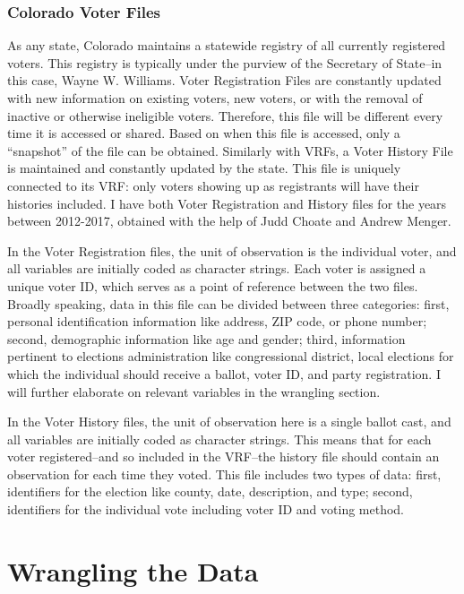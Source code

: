 \documentclass[12pt,twoside]{reedthesis}
\begin{document}
  \subsubsection{Colorado Voter Files}\label{colorado-voter-files}
  
  As any state, Colorado maintains a statewide registry of all currently
  registered voters. This registry is typically under the purview of the
  Secretary of State--in this case, Wayne W. Williams. Voter Registration
  Files are constantly updated with new information on existing voters,
  new voters, or with the removal of inactive or otherwise ineligible
  voters. Therefore, this file will be different every time it is accessed
  or shared. Based on when this file is accessed, only a ``snapshot'' of
  the file can be obtained. Similarly with VRFs, a Voter History File is
  maintained and constantly updated by the state. This file is uniquely
  connected to its VRF: only voters showing up as registrants will have
  their histories included. I have both Voter Registration and History
  files for the years between 2012-2017, obtained with the help of Judd
  Choate and Andrew Menger.
  
  In the Voter Registration files, the unit of observation is the
  individual voter, and all variables are initially coded as character
  strings. Each voter is assigned a unique voter ID, which serves as a
  point of reference between the two files. Broadly speaking, data in this
  file can be divided between three categories: first, personal
  identification information like address, ZIP code, or phone number;
  second, demographic information like age and gender; third, information
  pertinent to elections administration like congressional district, local
  elections for which the individual should receive a ballot, voter ID,
  and party registration. I will further elaborate on relevant variables
  in the wrangling section.
  
  In the Voter History files, the unit of observation here is a single
  ballot cast, and all variables are initially coded as character strings.
  This means that for each voter registered--and so included in the
  VRF--the history file should contain an observation for each time they
  voted. This file includes two types of data: first, identifiers for the
  election like county, date, description, and type; second, identifiers
  for the individual vote including voter ID and voting method.
  
  \section{Wrangling the Data}\label{wrangling-the-data}
  
\end{document}
